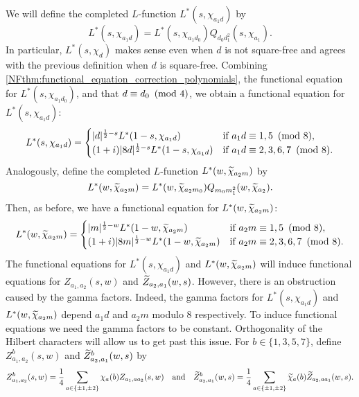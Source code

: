     We will define the completed $L$-function $L^{\ast}(s,\chi_{a_{1}d})$ by
    \[
        L^{\ast}(s,\chi_{a_{1}d}) = L^{\ast}(s,\chi_{a_{1}d_{0}})Q_{d_{0}d_{1}^{2}}(s,\chi_{a_{1}}).
    \]
    In particular, $L^{\ast}(s,\chi_{d})$ makes sense even when $d$ is not square-free and agrees with the previous definition when $d$ is square-free. Combining \cref{NFthm:functional_equation_correction_polynomials}, the functional equation for $L^{\ast}(s,\chi_{a_{1}d_{0}})$, and that $d \equiv d_{0} \ \left(\text{mod }4\right)$, we obtain a functional equation for $L^{\ast}(s,\chi_{a_{1}d})$:
    \[
        L^{\ast}(s,\chi_{a_{1}d}) = \begin{cases} |d|^{\frac{1}{2}-s}L^{\ast}(1-s,\chi_{a_{1}d}) & \text{if $a_{1}d \equiv 1,5 \ \left(\text{mod }8\right)$}, \\ (1+i)|8d|^{\frac{1}{2}-s}L^{\ast}(1-s,\chi_{a_{1}d}) & \text{if $a_{1}d \equiv 2,3,6,7 \ \left(\text{mod }8\right)$}. \end{cases}
    \]
    Analogously, define the completed $L$-function $L^{\ast}(w,\widetilde{\chi}_{a_{2}m})$ by
    \[
        L^{\ast}(w,\widetilde{\chi}_{a_{2}m}) = L^{\ast}(w,\widetilde{\chi}_{a_{2}m_{0}})Q_{m_{0}m_{1}^{2}}(w,\widetilde{\chi}_{a_{2}}).
    \]
    Then, as before, we have a functional equation for $L^{\ast}(w,\widetilde{\chi}_{a_{2}m})$:
    \[
        L^{\ast}(w,\widetilde{\chi}_{a_{2}m}) = \begin{cases} |m|^{\frac{1}{2}-w}L^{\ast}(1-w,\widetilde{\chi}_{a_{2}m}) & \text{if $a_{2}m \equiv 1,5 \ \left(\text{mod }8\right)$}, \\ (1+i)|8m|^{\frac{1}{2}-w}L^{\ast}(1-w,\widetilde{\chi}_{a_{2}m}) & \text{if $a_{2}m \equiv 2,3,6,7 \ \left(\text{mod }8\right)$}. \end{cases}
    \]
    The functional equations for $L^{\ast}(s,\chi_{a_{1}d})$ and $L^{\ast}(w,\widetilde{\chi}_{a_{2}m})$ will induce functional equations for $Z_{a_{1},a_{2}}(s,w)$ and $\widetilde{Z}_{a_{2},a_{1}}(w,s)$. However, there is an obstruction caused by the gamma factors. Indeed, the gamma factors for $L^{\ast}(s,\chi_{a_{1}d})$ and $L^{\ast}(w,\widetilde{\chi}_{a_{2}m})$ depend $a_{1}d$ and $a_{2}m$ modulo $8$ respectively. To induce functional equations we need the gamma factors to be constant. Orthogonality of the Hilbert characters will allow us to get past this issue. For $b \in \{1,3,5,7\}$, define $Z_{a_{1},a_{2}}^{b}(s,w)$ and $\widetilde{Z}_{a_{2},a_{1}}^{b}(w,s)$ by
    \[
        Z_{a_{1},a_{2}}^{b}(s,w) = \frac{1}{4}\sum_{a \in \{\pm1,\pm2\}}\chi_{a}(b)Z_{a_{1},aa_{2}}(s,w) \quad \text{and} \quad \widetilde{Z}_{a_{2},a_{1}}^{b}(w,s) = \frac{1}{4}\sum_{a \in \{\pm1,\pm2\}}\widetilde{\chi}_{a}(b)\widetilde{Z}_{a_{2},aa_{1}}(w,s).
    \]
